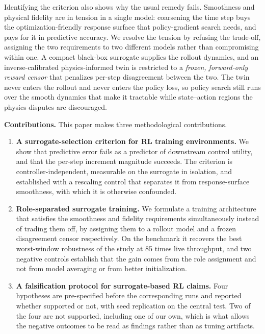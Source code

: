 \documentclass[energies,article,submit,moreauthors]{Definitions/mdpi}
\begin{document}
Identifying the criterion also shows why the usual remedy fails. Smoothness and physical fidelity
are in tension in a single model: coarsening the time step buys the optimization-friendly response
surface that policy-gradient search needs, and pays for it in predictive accuracy. We resolve the
tension by refusing the trade-off, assigning the two requirements to two different models rather
than compromising within one. A compact black-box surrogate supplies the rollout dynamics, and an
inverse-calibrated physics-informed twin is restricted to a \emph{frozen, forward-only reward
censor} that penalizes per-step disagreement between the two. The twin never enters the rollout and
never enters the policy loss, so policy search still runs over the smooth dynamics that make it
tractable while state--action regions the physics disputes are discouraged.

\textbf{Contributions.} This paper makes three methodological contributions.

\begin{enumerate}[leftmargin=*,itemsep=2pt,topsep=3pt]
\item \textbf{A surrogate-selection criterion for RL training environments.} We show that predictive
error fails as a predictor of downstream control utility, and that the per-step increment magnitude
succeeds. The criterion is controller-independent, measurable on the surrogate in isolation, and
established with a rescaling control that separates it from response-surface smoothness, with which
it is otherwise confounded.
\item \textbf{Role-separated surrogate training.} We formulate a training architecture that
satisfies the smoothness and fidelity requirements simultaneously instead of trading them off, by
assigning them to a rollout model and a frozen disagreement censor respectively. On the benchmark it
recovers the best worst-window robustness of the study at 85 times live throughput, and two negative
controls establish that the gain comes from the role assignment and not from model averaging or from
better initialization.
\item \textbf{A falsification protocol for surrogate-based RL claims.} Four hypotheses are
pre-specified before the corresponding runs and reported whether supported or not, with seed
replication on the central test. Two of the four are not supported, including one of our own, which
is what allows the negative outcomes to be read as findings rather than as tuning artifacts.
\end{enumerate}
\end{document}
